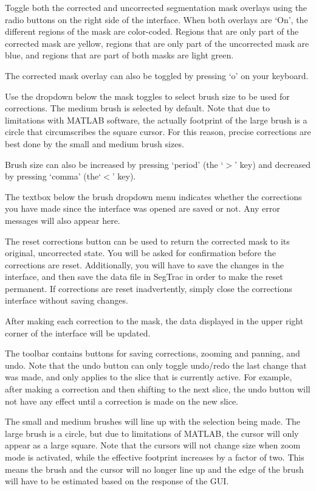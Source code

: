 \documentclass[twoside,a4paper]{refart}
\begin{document}
Toggle both the corrected and uncorrected segmentation mask overlays using the radio buttons on the right side of the interface. When both overlays are `On', the different regions of the mask are color-coded. Regions that are only part of the corrected mask are yellow, regions that are only part of the uncorrected mask are blue, and regions that are part of both masks are light green.

The corrected mask overlay can also be toggled by pressing `o' on your keyboard.

Use the dropdown below the mask toggles to select brush size to be used for corrections. The medium brush is selected by default. Note that due to limitations with MATLAB software, the actually footprint of the large brush is a circle that circumscribes the square cursor. For this reason, precise corrections are best done by the small and medium brush sizes.

Brush size can also be increased by pressing `period' (the `$>$' key) and decreased by  pressing `comma' (the`$<$' key).

The textbox below the brush dropdown menu indicates whether the corrections you have made since the interface was opened are saved or not. Any error messages will also appear here.


The reset corrections button can be used to return the corrected mask to its original, uncorrected state. You will be asked for confirmation before the corrections are reset. Additionally, you will have to save the changes in the interface, and then save the data file in SegTrac in order to make the reset permanent. If corrections are reset inadvertently, simply close the corrections interface without saving changes.

After making each correction to the mask, the data displayed in the upper right corner of the interface will be updated.

The toolbar contains buttons for saving corrections, zooming and panning, and undo. Note that the undo button can only toggle undo/redo the last change that was made, and only applies to the slice that is currently active. For example, after making a correction and then shifting to the next slice, the undo button will not have any effect until a correction is made on the new slice.


The small and medium brushes will line up with the selection being made. The large brush is a circle, but due to limitations of MATLAB, the cursor will only appear as a large square.
Note that the cursors will not change size when zoom mode is activated, while the effective footprint increases by a factor of two. This means the brush and the cursor will no longer line up and the edge of the brush will have to be estimated based on the response of the GUI.
\end{document}
